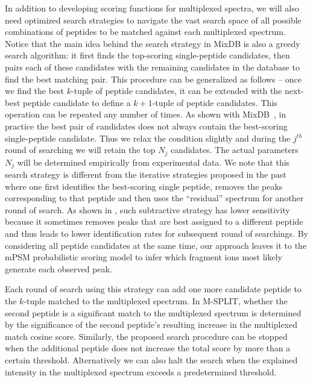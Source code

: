 \documentclass[arial,11pt]{article}
\begin{document}
In addition to developing scoring functions for multiplexed spectra, we will also need optimized search strategies to navigate the vast search space of all possible combinations of peptides to be matched against each multiplexed spectrum.  Notice that the main idea behind the search strategy in MixDB is also a greedy search algorithm: it first finds the top-scoring single-peptide candidates, then pairs each of these candidates with the remaining candidates in the database to find the best matching pair. This procedure can be generalized as follows -- once we find the best $k$-tuple of peptide candidates, it can be extended with the next-best peptide candidate to define a $k+1$-tuple of peptide candidates. This operation can be repeated any number of times. As shown with MixDB~\cite{wang2011peptide}, in practice the best pair of candidates does not always contain the best-scoring single-peptide candidate. Thus we relax the condition slightly and during the $j^{th}$ round of searching we will retain the top $N_{j}$ candidates. The actual parameters $N_{j}$ will be determined empirically from experimental data.  We note that this search strategy is different from the iterative strategies proposed in the past where one first identifies the best-scoring single peptide, removes the peaks corresponding to that peptide and then uses the ``residual'' spectrum for another round of search. As shown in \cite{wang2011peptide}, such subtractive strategy has lower sensitivity because it sometimes removes peaks that are best assigned to a different peptide and thus leads to lower identification rates for subsequent round of searchings.  By considering all peptide candidates at the same time, our approach leaves it to the mPSM probabilistic scoring model to infer which fragment ions most likely generate each observed peak.

Each round of search using this strategy can add one more candidate peptide to the $k$-tuple matched to the multiplexed spectrum.  In M-SPLIT, whether the second peptide is a significant match to the multiplexed spectrum is determined by the significance of the second peptide's resulting increase in the multiplexed match cosine score.  Similarly, the proposed search procedure can be stopped when the additional peptide does not increase the total score by more than a certain threshold.  Alternatively we can also halt the search when the explained intensity in the multiplexed spectrum exceeds a predetermined threshold.
\end{document}
